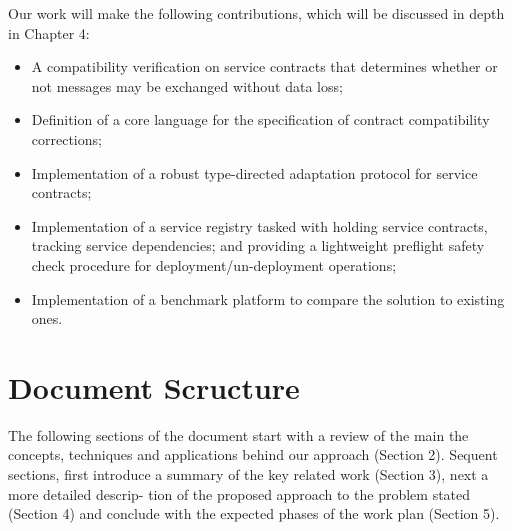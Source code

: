 Our work will make the following contributions, which will be discussed in depth in Chapter 4:

\begin{itemize}
    \item A compatibility verification on service contracts that determines whether or not messages may be exchanged without data loss;
    \item Definition of a core language for the specification of contract compatibility corrections;
    \item Implementation of a robust type-directed adaptation protocol for service contracts;
    \item Implementation of a service registry tasked with holding service contracts, tracking service dependencies;
    and providing a lightweight preflight safety check procedure for deployment/un-deployment operations;
    \item Implementation of a benchmark platform to compare the solution to existing ones.
\end{itemize}

\section{Document Scructure} %
\label{sec:document_structure}

The following sections of the document start with a review of the main the concepts,
techniques and applications behind our approach (Section 2).
Sequent sections, first introduce a summary of the key related work (Section 3), next a more detailed descrip-
tion of the proposed approach to the problem stated (Section 4) and conclude with the
expected phases of the work plan (Section 5).